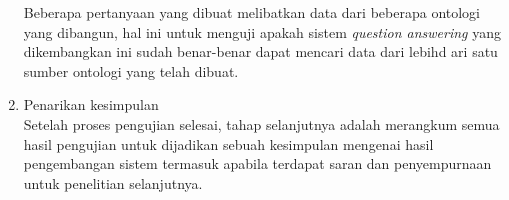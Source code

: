 \begin{enumerate}
	Beberapa pertanyaan yang dibuat melibatkan data dari beberapa ontologi yang dibangun, hal ini untuk menguji apakah sistem \emph{question answering} yang dikembangkan ini sudah benar-benar dapat mencari data dari lebihd ari satu sumber ontologi yang telah dibuat.
	\item Penarikan kesimpulan\\
	Setelah proses pengujian selesai, tahap selanjutnya adalah merangkum semua hasil pengujian untuk dijadikan sebuah kesimpulan mengenai hasil pengembangan sistem termasuk apabila terdapat saran dan penyempurnaan untuk penelitian selanjutnya.
\end{enumerate}